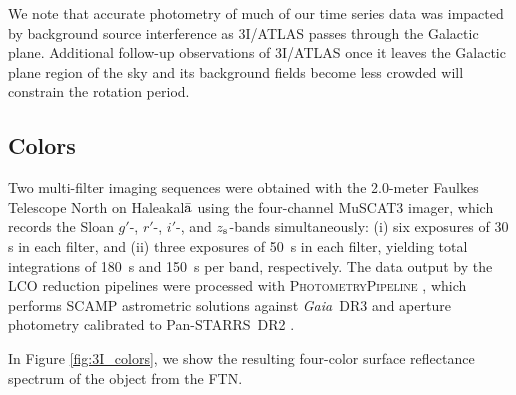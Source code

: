 \documentclass[linenumbers,twocolumn,longbib]{aastex7}
\begin{document}
We note that accurate photometry of much of our time series data was impacted by background source interference as 3I/ATLAS passes through the Galactic plane.
Additional follow-up observations of 3I/ATLAS once it leaves the Galactic plane region of the sky and its background fields become less crowded will constrain the rotation period.


\subsection{Colors}\label{sec:colors}

Two multi-filter imaging sequences were obtained with the 2.0-meter Faulkes Telescope North on Haleakal${\rm\bar{a}}$ using the four-channel MuSCAT3 imager, which records the Sloan $g'$-, $r'$-, $i'$-, and $z_{\rm s}$-bands simultaneously: (i) six exposures of 30 s in each filter, and (ii) three exposures of 50~s in each filter, yielding total integrations of 180~s and 150~s per band, respectively. The data output by the LCO reduction pipelines were processed with \textsc{PhotometryPipeline} \citep{Mommert_2017}, which performs SCAMP astrometric solutions against \textit{Gaia}~DR3 \citep{gaiacollaboration2023_gaiadr3} and aperture photometry calibrated to Pan-STARRS~DR2 \citep{flewelling2020_ps1}.

In Figure \ref{fig:3I_colors}, we show the resulting four-color surface reflectance spectrum of the object from the FTN.
\end{document}
